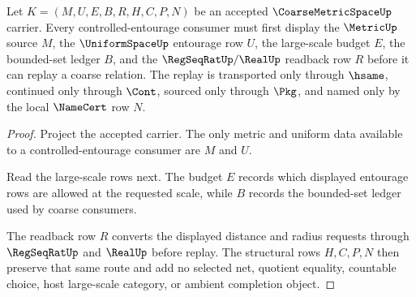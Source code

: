 \begin{theorem}
\label{thm:coarse-metric-space-controlled-entourage-route}
Let $K=(M,U,E,B,R,H,C,P,N)$ be an accepted $\CoarseMetricSpaceUp$ carrier. Every controlled-entourage consumer must first display the $\MetricUp$ source $M$, the $\UniformSpaceUp$ entourage row $U$, the large-scale budget $E$, the bounded-set ledger $B$, and the $\RegSeqRatUp/\RealUp$ readback row $R$ before it can replay a coarse relation. The replay is transported only through $\hsame$, continued only through $\Cont$, sourced only through $\Pkg$, and named only by the local $\NameCert$ row $N$.
\end{theorem}
\begin{proof}
Project the accepted carrier. The only metric and uniform data available to a controlled-entourage consumer are $M$ and $U$.

Read the large-scale rows next. The budget $E$ records which displayed entourage rows are allowed at the requested scale, while $B$ records the bounded-set ledger used by coarse consumers.

The readback row $R$ converts the displayed distance and radius requests through $\RegSeqRatUp$ and $\RealUp$ before replay. The structural rows $H,C,P,N$ then preserve that same route and add no selected net, quotient equality, countable choice, host large-scale category, or ambient completion object.
\end{proof}




